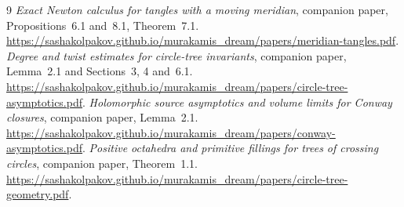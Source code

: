 \documentclass[11pt]{article}
\numberwithin{equation}{section}
\theoremstyle{definition}\newtheorem{definition}[theorem]{Definition}
\theoremstyle{remark}\newtheorem{remark}[theorem]{Remark}
\begin{document}
\begin{thebibliography}{9}
\emph{Exact Newton calculus for tangles with a moving meridian},
companion paper, Propositions~6.1 and~8.1, Theorem~7.1.
\url{https://sashakolpakov.github.io/murakamis_dream/papers/meridian-tangles.pdf}.
\emph{Degree and twist estimates for circle-tree invariants},
companion paper, Lemma~2.1 and Sections~3, 4 and~6.1.
\url{https://sashakolpakov.github.io/murakamis_dream/papers/circle-tree-asymptotics.pdf}.
\emph{Holomorphic source asymptotics and volume limits for Conway closures},
companion paper, Lemma~2.1.
\url{https://sashakolpakov.github.io/murakamis_dream/papers/conway-asymptotics.pdf}.
\emph{Positive octahedra and primitive fillings for trees of crossing circles}, companion paper, Theorem~1.1.
\url{https://sashakolpakov.github.io/murakamis_dream/papers/circle-tree-geometry.pdf}.
\end{thebibliography}
\end{document}
